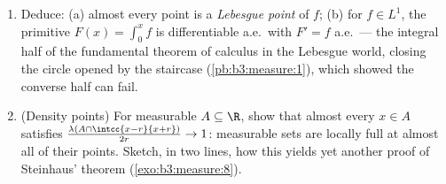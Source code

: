 \begin{problem}
\begin{enumerate}[resume]
{        $\delta$ sits inside $\{Mh > \delta/2\} \cup \{\abs h
        > \delta/2\}$, of measure $O(\varepsilon/\delta)$;
        let $\varepsilon \to 0$, then $\delta \to 0$ along a
        sequence.)}
  \item Deduce: (a) almost every point is a \emph{Lebesgue
        point} of $f$; (b) for $f \in L^1$, the primitive
        $F(x) = \int_0^xf$ is differentiable a.e.\ with $F' =
        f$ a.e.\ --- the integral half of the fundamental
        theorem of calculus in the Lebesgue world, closing
        the circle opened by the staircase
        (\cref{pb:b3:measure:1}), which showed the converse
        half can fail.
  \item (Density points) For measurable $A \subseteq \R$,
        show that almost every $x \in A$ satisfies
        $\frac{\lambda(A\cap\intcc{x-r}{x+r})}{2r} \to 1$:
        measurable sets are locally full at almost all of
        their points. Sketch, in two lines, how this yields
        yet another proof of Steinhaus' theorem
        (\cref{exo:b3:measure:8}).
\end{enumerate}


\end{problem}
